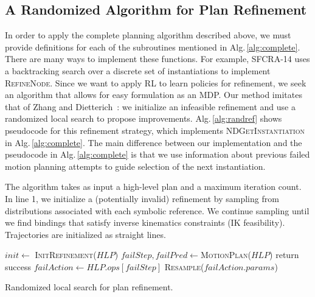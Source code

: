 \subsection{A Randomized Algorithm for Plan Refinement}
In order to apply the complete planning algorithm described above, we must provide definitions for each of the subroutines mentioned in Alg.\,\ref{alg:complete}. There are many ways to implement these functions. For example, SFCRA-14 uses a backtracking search over a discrete set of instantiations to implement \textsc{RefineNode}. Since we want to apply RL to learn policies for refinement,
we seek an algorithm that allows for easy formulation as an MDP. Our method
imitates that of Zhang and Dietterich~\cite{JobShopSched}:
we initialize an infeasible refinement and use a randomized local search to propose
improvements. Alg.\,\ref{alg:randref} shows pseudocode for this refinement strategy,
which implements \textsc{NDGetInstantiation} in Alg.\,\ref{alg:complete}. The main difference between our implementation and the pseudocode in Alg.\,\ref{alg:complete} is that we use information about previous failed motion planning attempts to guide selection of the next instantiation.

The algorithm takes as input a high-level plan and a maximum iteration count.
In line 1, we initialize a (potentially invalid) refinement by sampling from distributions associated
with each symbolic reference. We continue sampling
until we find bindings that satisfy inverse kinematics constraints (IK feasibility). Trajectories are
initialized as straight lines.

\begin{algorithm}[t]
\begin{small}
  \SetAlgoLined
  \DontPrintSemicolon
   {
  \nl $init \leftarrow$ \textsc{InitRefinement}($HLP$)\;
  \nl {} {
  \nl $failStep, failPred \leftarrow $\textsc{MotionPlan}($HLP$)\;
  \nl {} {
  \nl return success }
  \nl {} {
  \nl $failAction \leftarrow HLP.ops[failStep]$\;
  \nl \textsc{Resample}($failAction.params$) }
  \nl {} }}

\end{small}
\caption{Randomized local search for plan refinement.}
\label{alg:randref}
\end{algorithm}

